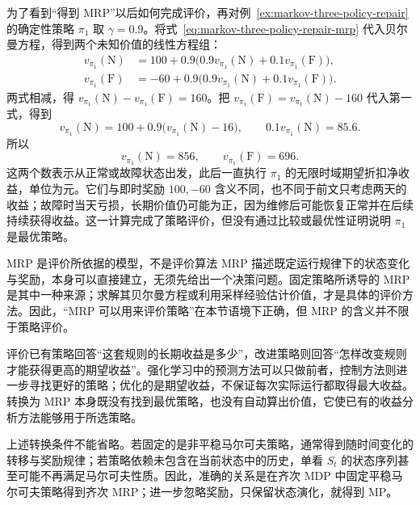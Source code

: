 \documentclass[UTF8,12pt,a4paper,fontset=fandol]{ctexart}
\begin{document}
为了看到“得到 MRP”以后如何完成评价，再对例~\ref{ex:markov-three-policy-repair} 的确定性策略 $\pi_1$ 取 $\gamma=0.9$。将式~\eqref{eq:markov-three-policy-repair-mrp} 代入贝尔曼方程，得到两个未知价值的线性方程组：
\begin{equation}
  \begin{aligned}
    v_{\pi_1}(\mathrm N)&=100+0.9\bigl(0.9v_{\pi_1}(\mathrm N)+0.1v_{\pi_1}(\mathrm F)\bigr),\\
    v_{\pi_1}(\mathrm F)&=-60+0.9\bigl(0.9v_{\pi_1}(\mathrm N)+0.1v_{\pi_1}(\mathrm F)\bigr).
  \end{aligned}
  \label{eq:markov-three-repair-bellman}
\end{equation}
两式相减，得 $v_{\pi_1}(\mathrm N)-v_{\pi_1}(\mathrm F)=160$。把 $v_{\pi_1}(\mathrm F)=v_{\pi_1}(\mathrm N)-160$ 代入第一式，得到
\[
  v_{\pi_1}(\mathrm N)=100+0.9\bigl(v_{\pi_1}(\mathrm N)-16\bigr),
  \qquad
  0.1v_{\pi_1}(\mathrm N)=85.6.
\]
所以
\begin{equation}
  v_{\pi_1}(\mathrm N)=856,\qquad v_{\pi_1}(\mathrm F)=696.
  \label{eq:markov-three-repair-values}
\end{equation}
这两个数表示从正常或故障状态出发，此后一直执行 $\pi_1$ 的无限时域期望折扣净收益，单位为元。它们与即时奖励 $100,-60$ 含义不同，也不同于前文只考虑两天的收益；故障时当天亏损，长期价值仍可能为正，因为维修后可能恢复正常并在后续持续获得收益。这一计算完成了策略评价，但没有通过比较或最优性证明说明 $\pi_1$ 是最优策略。

\begin{remarkbox}[label={rem:markov-three-mrp-evaluation}]{MRP 是评价所依据的模型，不是评价算法}
MRP 描述既定运行规律下的状态变化与奖励，本身可以直接建立，无须先给出一个决策问题。固定策略所诱导的 MRP 是其中一种来源；求解其贝尔曼方程或利用采样经验估计价值，才是具体的评价方法。因此，“MRP 可以用来评价策略”在本节语境下正确，但 MRP 的含义并不限于策略评价。

评价已有策略回答“这套规则的长期收益是多少”，改进策略则回答“怎样改变规则才能获得更高的期望收益”。强化学习中的预测方法可以只做前者，控制方法则进一步寻找更好的策略；优化的是期望收益，不保证每次实际运行都取得最大收益。转换为 MRP 本身既没有找到最优策略，也没有自动算出价值，它使已有的收益分析方法能够用于所选策略。
\end{remarkbox}

上述转换条件不能省略。若固定的是非平稳马尔可夫策略，通常得到随时间变化的转移与奖励规律；若策略依赖未包含在当前状态中的历史，单看 $S_t$ 的状态序列甚至可能不再满足马尔可夫性质。因此，准确的关系是在齐次 MDP 中固定平稳马尔可夫策略得到齐次 MRP；进一步忽略奖励，只保留状态演化，就得到 MP。
\end{document}
